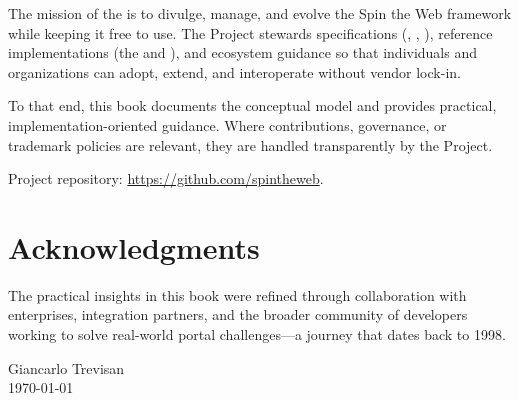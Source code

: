 The mission of the \organization{} is to divulge, manage, and evolve the Spin the Web framework while keeping it free to use. The Project stewards specifications (\wbdl, \wbpl, \wbll), reference implementations (the \webspinner and \studio), and ecosystem guidance so that individuals and organizations can adopt, extend, and interoperate without vendor lock-in.

To that end, this book documents the conceptual model and provides practical, implementation-oriented guidance. Where contributions, governance, or trademark policies are relevant, they are handled transparently by the Project.

Project repository: \url{https://github.com/spintheweb}.

\section*{Acknowledgments}

The practical insights in this book were refined through collaboration with enterprises, integration partners, and the broader community of developers working to solve real-world portal challenges---a journey that dates back to 1998.

\vspace{1cm}
\nopagebreak
\hfill Giancarlo Trevisan \\
\hfill \today
